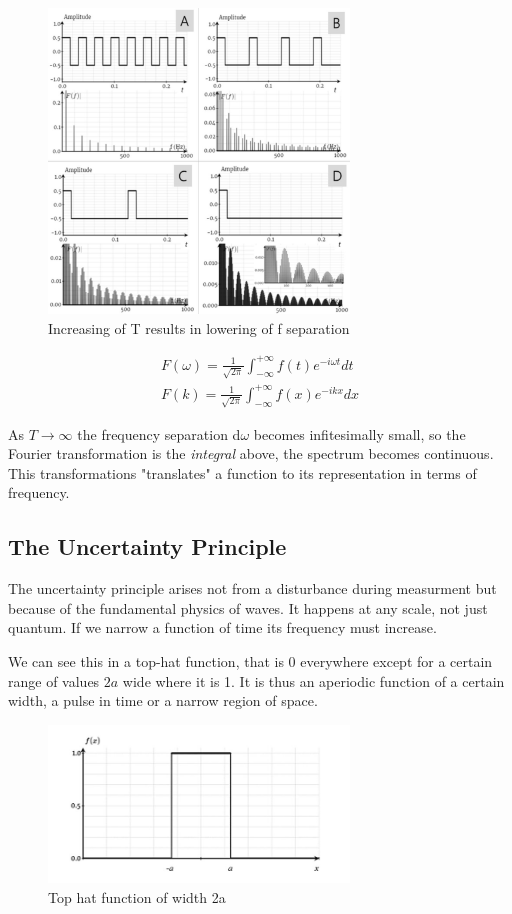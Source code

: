 \documentclass[11pt]{article}
\begin{document}
    \begin{figure}[h]
        \centering
        \includegraphics[width=8cm]{1.jpg}
        \caption{Increasing of T results in lowering of f separation}
    \end{figure}
    
    \begin{align*}
        F(\omega) = \frac{1}{\sqrt{2\pi}} \int_{-\infty}^{+\infty} f(t) e^{-i\omega t} dt\\
        F(k) = \frac{1}{\sqrt{2\pi}} \int_{-\infty}^{+\infty} f(x) e^{-ikx} dx
    \end{align*}

    As \(T \to \infty\) the frequency separation d\(\omega\) becomes infitesimally small, so the Fourier
    transformation is the \emph{integral} above, the spectrum becomes continuous. This transformations "translates" a function to its representation
    in terms of frequency. 

    \subsection{The Uncertainty Principle}
    The uncertainty principle arises not from a disturbance during measurment but because of the fundamental
    physics of waves. It happens at any scale, not just quantum. If we narrow a function of time its frequency
    must increase. 

    We can see this in a top-hat function, that is 0 everywhere except for a certain range of values \(2a\) wide
    where it is 1. It is thus an aperiodic function of a certain width, a pulse in time or a narrow region of space.

    \begin{figure}[h]
        \centering
        \includegraphics[width=8cm]{2.jpg}
        \caption{Top hat function of width 2a}
    \end{figure}
\end{document}
